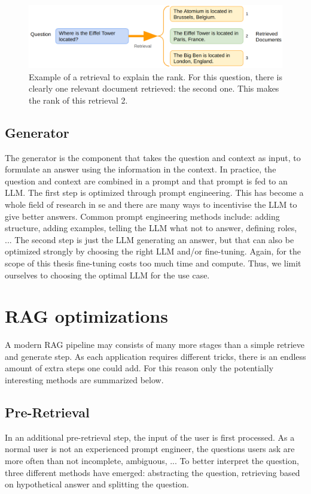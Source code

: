 \begin{figure}[h]
	\centering
	\captionsetup{justification=centering}
	\includegraphics[width=0.9\linewidth]{fig/RAG_rank.png}
	\caption{Example of a retrieval to explain the rank. For this question, there is clearly one relevant document retrieved: the second one. This makes the rank of this retrieval 2.}
	\label{fig:rag_rank}
\end{figure}

\subsection{Generator}
The generator is the component that takes the question and context as input, to formulate an answer using the information in the context. In practice, the question and context are combined in a prompt and that prompt is fed to an LLM. The first step is optimized through prompt engineering. This has become a whole field of research in se and there are many ways to incentivise the LLM to give better answers. Common prompt engineering methods include: adding structure, adding examples, telling the LLM what not to answer, defining roles, ... The second step is just the LLM generating an answer, but that can also be optimized strongly by choosing the right LLM and/or fine-tuning. Again, for the scope of this thesis fine-tuning costs too much time and compute. Thus, we limit ourselves to choosing the optimal LLM for the use case.

\section{RAG optimizations}
A modern RAG pipeline may consists of many more stages than a simple retrieve and generate step. As each application requires different tricks, there is an endless amount of extra steps one could add. For this reason only the potentially interesting methods are summarized below.

\subsection{Pre-Retrieval}
In an additional pre-retrieval step, the input of the user is first processed. As a normal user is not an experienced prompt engineer, the questions users ask are more often than not incomplete, ambiguous, ... To better interpret the question, three different methods have emerged: abstracting the question, retrieving based on hypothetical answer and splitting the question.

